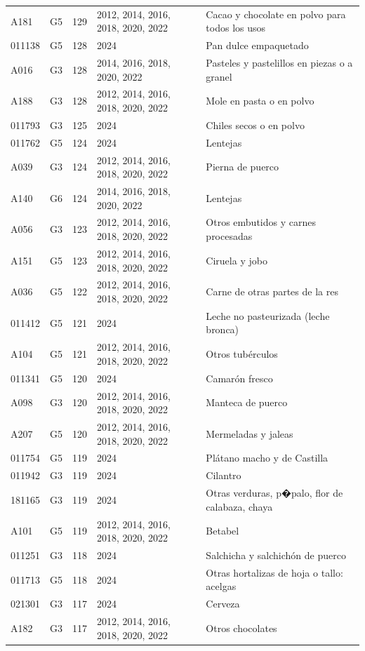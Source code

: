 \begin{table}[ht]
\begin{tabular}{llrll}
  A181 & G5 & 129 & 2012, 2014, 2016, 2018, 2020, 2022 & Cacao y chocolate en polvo para todos los usos \\ 
  011138 & G5 & 128 & 2024 & Pan dulce empaquetado \\ 
  A016 & G3 & 128 & 2014, 2016, 2018, 2020, 2022 & Pasteles y pastelillos en piezas o a granel \\ 
  A188 & G3 & 128 & 2012, 2014, 2016, 2018, 2020, 2022 & Mole en pasta o en polvo \\ 
  011793 & G3 & 125 & 2024 & Chiles secos o en polvo \\ 
  011762 & G5 & 124 & 2024 & Lentejas \\ 
  A039 & G3 & 124 & 2012, 2014, 2016, 2018, 2020, 2022 & Pierna de puerco \\ 
  A140 & G6 & 124 & 2014, 2016, 2018, 2020, 2022 & Lentejas \\ 
  A056 & G3 & 123 & 2012, 2014, 2016, 2018, 2020, 2022 & Otros embutidos y carnes procesadas \\ 
  A151 & G5 & 123 & 2012, 2014, 2016, 2018, 2020, 2022 & Ciruela y jobo \\ 
  A036 & G5 & 122 & 2012, 2014, 2016, 2018, 2020, 2022 & Carne de otras partes de la res \\ 
  011412 & G5 & 121 & 2024 & Leche no pasteurizada (leche bronca) \\ 
  A104 & G5 & 121 & 2012, 2014, 2016, 2018, 2020, 2022 & Otros tubérculos \\ 
  011341 & G5 & 120 & 2024 & Camarón fresco \\ 
  A098 & G3 & 120 & 2012, 2014, 2016, 2018, 2020, 2022 & Manteca de puerco \\ 
  A207 & G5 & 120 & 2012, 2014, 2016, 2018, 2020, 2022 & Mermeladas y jaleas \\ 
  011754 & G5 & 119 & 2024 & Plátano macho y de Castilla \\ 
  011942 & G3 & 119 & 2024 & Cilantro \\ 
  181165 & G3 & 119 & 2024 & Otras verduras, p�palo, flor de calabaza, chaya \\ 
  A101 & G5 & 119 & 2012, 2014, 2016, 2018, 2020, 2022 & Betabel \\ 
  011251 & G3 & 118 & 2024 & Salchicha y salchichón de puerco \\ 
  011713 & G5 & 118 & 2024 & Otras hortalizas de hoja o tallo: acelgas \\ 
  021301 & G3 & 117 & 2024 & Cerveza \\ 
  A182 & G3 & 117 & 2012, 2014, 2016, 2018, 2020, 2022 & Otros chocolates \\ 

\end{tabular}
\end{table}
